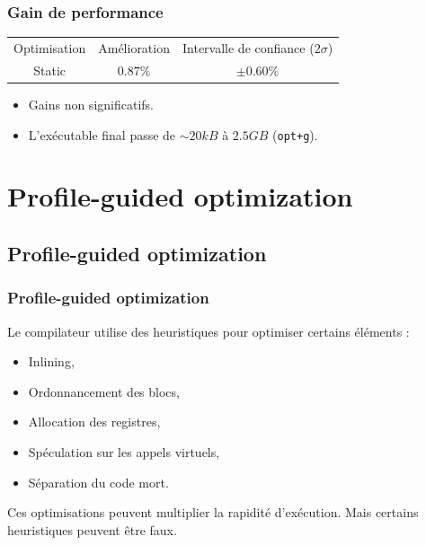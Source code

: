 \documentclass{beamer}
\begin{document}
\begin{frame}[fragile]
    \frametitle{Gain de performance}

    \begin{center}
        \begin{tabular}{ c c c }
            Optimisation & Amélioration & Intervalle de confiance ($2\sigma$) \\
            Static       & $0.87\%$     & $\pm 0.60\%$
        \end{tabular}
    \end{center}

    \begin{itemize}
        \item Gains non significatifs.
        \item L'exécutable final passe de $ \sim 20 kB $ à $ 2.5 GB $ (\verb'opt+g').
    \end{itemize}
\end{frame}

\section{Profile-guided optimization}

\begin{frame}
    \tableofcontents[currentsection]
\end{frame}

\subsection{Profile-guided optimization}

\begin{frame}
    \frametitle{Profile-guided optimization}

    Le compilateur utilise des heuristiques pour optimiser certains éléments :
    \begin{itemize}
        \item Inlining,
        \item Ordonnancement des blocs,
        \item Allocation des registres,
        \item Spéculation sur les appels virtuels,
        \item Séparation du code mort.
    \end{itemize}
    Ces optimisations peuvent multiplier la rapidité d'exécution.
    Mais certains heuristiques peuvent être faux.
\end{frame}
\end{document}
